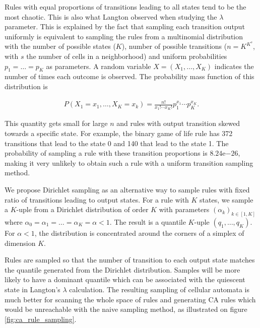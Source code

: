 Rules with equal proportions of transitions leading to all states tend to be the
most chaotic. This is also what Langton observed when studying the $\lambda$
parameter. This is explained by the fact that sampling each transition output
uniformly is equivalent to sampling the rules from a multinomial distribution
with the number of possible states ($K$), number of possible transitions
($n = K^{K^{s}}$, with $s$ the number of cells in a neighborhood) and uniform
probabilities $p_{1}= \ldots= p_{K}$ as parameters. A random variable
$X = (X_{1}, \ldots, X_{K})$ indicates the number of times each outcome is observed.
The probability mass function of this distribution is

\begin{equation}
  \label{eq:multinomial}
  \begin{aligned}
    P(X_{1}=x_{1}, \ldots , X_{K}=x_{k}) = \frac{n!}{x_{1}!\cdots x_{K}!} p_{1}^{x_{1}}\cdots p_{K}^{x_{K}}.
  \end{aligned}
\end{equation}

This quantity gets small for large $n$ and rules with output transition skewed
towards a specific state. For example, the binary game of life rule has 372
transitions that lead to the state 0 and 140 that lead to the state 1. The
probability of sampling a rule with these transition proportions is
$8.24\mathrm{e}{-26}$, making it very unlikely to obtain such a rule with a
uniform transition sampling method.

We propose Dirichlet sampling as an alternative way to sample rules with fixed
ratio of transitions leading to output states. For a rule with $K$ states, we
sample a $K$-uple from a Dirichlet distribution of order $K$ with parameters
$(\alpha_{k})_{k\in [1, K]}$ where $\alpha_{0} = \alpha_{1} = \ldots = \alpha_{K} = \alpha < 1$. The result is a
quantile $K$-uple $(q_{1}, \ldots, q_{K})$. For $\alpha < 1$, the distribution is
concentrated around the corners of a simplex of dimension $K$.

Rules are sampled so that the number of transition to each output state matches
the quantile generated from the Dirichlet distribution. Samples will be more
likely to have a dominant quantile which can be associated with the quiescent
state in Langton's $\lambda$ calculation. The resulting sampling of cellular automata
is much better for scanning the whole space of rules and generating \ac{CA}
rules which would be unreachable with the naive sampling method, as illustrated
on figure \ref{fig:ca_rule_sampling}.

